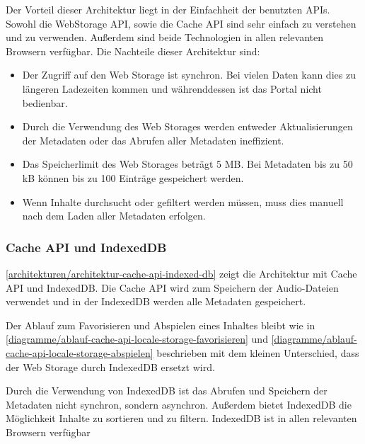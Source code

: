 
Der Vorteil dieser Architektur liegt in der Einfachheit der benutzten \acp{API}. Sowohl die WebStorage \ac{API}, sowie die Cache \ac{API} sind sehr einfach zu verstehen und zu verwenden. Außerdem sind beide Technologien in allen relevanten Browsern verfügbar. Die Nachteile dieser Architektur sind:

\begin{itemize}
\item Der Zugriff auf den Web Storage ist synchron. Bei vielen Daten kann dies zu längeren Ladezeiten kommen und währenddessen ist das Portal nicht bedienbar. 
\item Durch die Verwendung des Web Storages werden entweder Aktualisierungen der Metadaten oder das Abrufen aller Metadaten ineffizient. 
\item Das Speicherlimit des Web Storages beträgt 5 \ac{MB}. Bei Metadaten bis zu 50 \ac{kB} können bis zu 100 Einträge gespeichert werden. 
\item Wenn Inhalte durchsucht oder gefiltert werden müssen, muss dies manuell nach dem Laden aller Metadaten erfolgen.
\end{itemize}

\subsubsection{Cache API und IndexedDB}

\autoref{architekturen/architektur-cache-api-indexed-db} zeigt die Architektur mit Cache \ac{API} und IndexedDB. Die Cache \ac{API} wird zum Speichern der Audio-Dateien verwendet und in der IndexedDB werden alle Metadaten gespeichert.

Der Ablauf zum Favorisieren und Abspielen eines Inhaltes bleibt wie in \autoref{diagramme/ablauf-cache-api-locale-storage-favorisieren} und \autoref{diagramme/ablauf-cache-api-locale-storage-abspielen} beschrieben mit dem kleinen Unterschied, dass der Web Storage durch IndexedDB ersetzt wird. 

Durch die Verwendung von IndexedDB ist das Abrufen und Speichern der Metadaten nicht synchron, sondern asynchron. Außerdem bietet IndexedDB die Möglichkeit Inhalte zu sortieren und zu filtern. IndexedDB ist in allen relevanten Browsern verfügbar 

